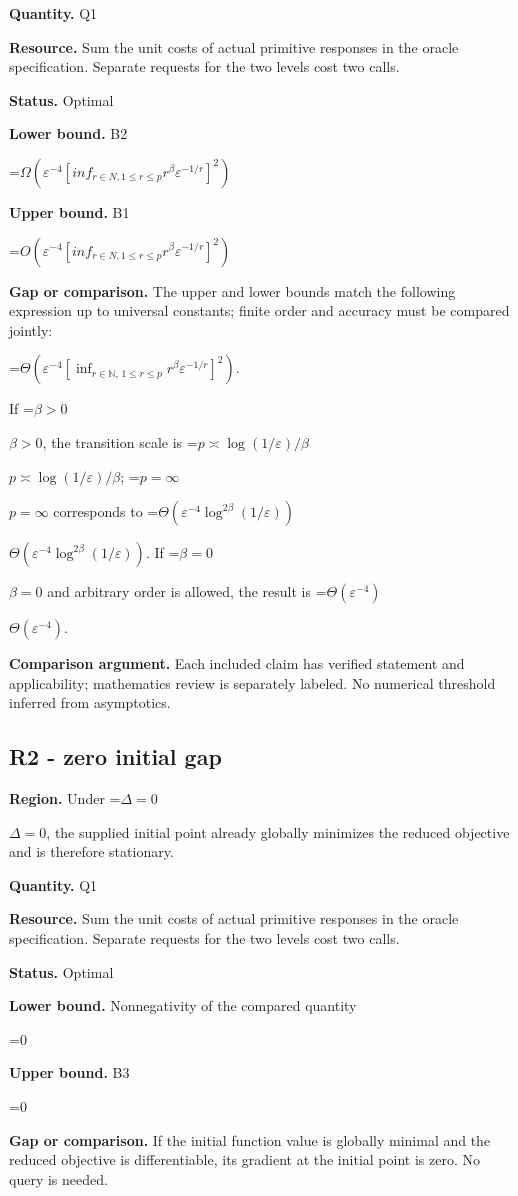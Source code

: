 \documentclass[10pt,a4paper]{article}
\newcommand{\AtlasMath}[1]{\par\begingroup\centering\setbox0=\hbox{$\displaystyle #1$}\ifdim\wd0>1.4\linewidth\typeout{ATLAS WIDE FORMULA: \the\wd0}\fi\ifdim\wd0>\linewidth\resizebox{\linewidth}{!}{\box0}\else\box0\fi\par\endgroup}
\newcommand{\AtlasInlineMath}[1]{\begingroup\setbox0=\hbox{$#1$}\ifdim\wd0>.4\linewidth\endgroup\AtlasMath{#1}\else\endgroup$#1$\fi}
\begin{document}
\textbf{Quantity.} Q1

\textbf{Resource.} Sum the unit costs of actual primitive responses in the oracle specification. Separate requests for the two levels cost two calls.

\textbf{Status.} Optimal

\textbf{Lower bound.} B2

\AtlasMath{\Omega (\varepsilon ^{-4} [inf_{r\in N,1\le r\le p} r^\beta  \varepsilon ^{-1/r}]^2)}
\textbf{Upper bound.} B1

\AtlasMath{O(\varepsilon ^{-4} [inf_{r\in N,1\le r\le p} r^\beta  \varepsilon ^{-1/r}]^2)}
\textbf{Gap or comparison.} The upper and lower bounds match the following expression up to universal constants; finite order and accuracy must be compared jointly: 
\AtlasMath{\Theta\!\left(\varepsilon^{-4}\left[\inf_{r\in\mathbb{N},\,1\le r\le p}r^\beta\varepsilon^{-1/r}\right]^2\right).}
 If \AtlasInlineMath{\beta>0}, the transition scale is \AtlasInlineMath{p\asymp\log(1/\varepsilon)/\beta}; \AtlasInlineMath{p=\infty} corresponds to \AtlasInlineMath{\Theta(\varepsilon^{-4}\log^{2\beta}(1/\varepsilon))}. If \AtlasInlineMath{\beta=0} and arbitrary order is allowed, the result is \AtlasInlineMath{\Theta(\varepsilon^{-4})}.

\textbf{Comparison argument.} Each included claim has verified statement and applicability; mathematics review is separately labeled. No numerical threshold inferred from asymptotics.

\subsection{R2 - zero initial gap}
\textbf{Region.} Under \AtlasInlineMath{\Delta=0}, the supplied initial point already globally minimizes the reduced objective and is therefore stationary.

\textbf{Quantity.} Q1

\textbf{Resource.} Sum the unit costs of actual primitive responses in the oracle specification. Separate requests for the two levels cost two calls.

\textbf{Status.} Optimal

\textbf{Lower bound.} Nonnegativity of the compared quantity

\AtlasMath{0}
\textbf{Upper bound.} B3

\AtlasMath{0}
\textbf{Gap or comparison.} If the initial function value is globally minimal and the reduced objective is differentiable, its gradient at the initial point is zero. No query is needed.
\end{document}
